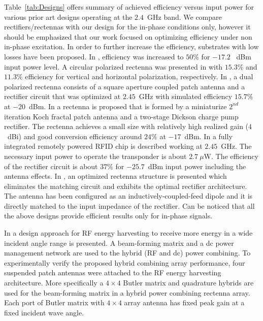 \documentclass[journal]{IEEEtran}
\begin{document}
%
Table~\ref{tab:Designs}  offers
summary of achieved efficiency versus input power for various prior art designs operating at the $2.4$~GHz band.
%
We compare rectifiers/rectennas with our design for the in-phase conditions only, however it should be emphasized that our work focused on optimizing efficiency under non in-phase excitation. 
%
In order to further increase the efficiency, substrates with low losses \cite{sun2012design, georgiadis2010rectenna, vera2010design, olgun2010wireless} have been  proposed.
%
In \cite{sun2012design}, efficiency was increased to $50 \% $ for $ -17.2$~ dBm  input power level. 
%
A circular polarized rectenna was presented in \cite{georgiadis2010rectenna} with $15.3\%$ and $11.3\%$ efficiency for vertical and horizontal polarization, respectively. 
%
In \cite{vera2010design}, a dual polarized rectenna  consists of a square aperture coupled patch antenna and a rectifier circuit that was optimized at $2.45$~GHz with simulated efficiency $15.7\% $ at $-20$~dBm. 
%
In \cite{olgun2010wireless}  a  rectenna is proposed that is formed by a miniaturize $2^{nd}$ iteration Koch fractal patch antenna and a two-stage Dickson charge pump rectifier.
%
The rectenna achieves a small size with relatively high
realized gain ($4$~dBi) and good  conversion efficiency around $24\%$ at $-17$~dBm.
%
%
%
In \cite{curty2005remotely} a fully integrated remotely
powered  RFID chip  is described working at $2.45$~GHz. 
%
The necessary input power to operate the transponder is about $2.7~\mu$W.
%
The efficiency of the rectifier circuit is about $37\%$ for $-25.7$~dBm input power including the antenna effects.
%
In \cite{chen2017maximum}, an optimized rectenna structure is presented  which eliminates the matching circuit and exhibits the optimal rectifier architecture.
%
The antenna has been configured as an inductively-coupled-feed dipole and it is directly matched to the input impedance of the rectifier.
%
Can be noticed that all the above designs provide efficient  results only for in-phase signals.
 


In \cite{lee2017hybrid}  a  design approach for RF energy harvesting to receive more energy in a wide incident angle range is presented. 
%
A beam-forming matrix and a dc power management network  are used to the hybrid (RF and dc) power combining.
%
To experimentally verify the proposed hybrid combining array performance, four suspended patch antennas were attached to the RF energy harvesting architecture.
%
More specifically a $4\times 4$ Butler matrix and quadrature hybrids are used for
the beam-forming matrix in a hybrid power combining rectenna array. 
%
Each port of Butler matrix with $4\times 4$ array antenna has fixed  peak gain at a  fixed incident wave angle.
\end{document}
